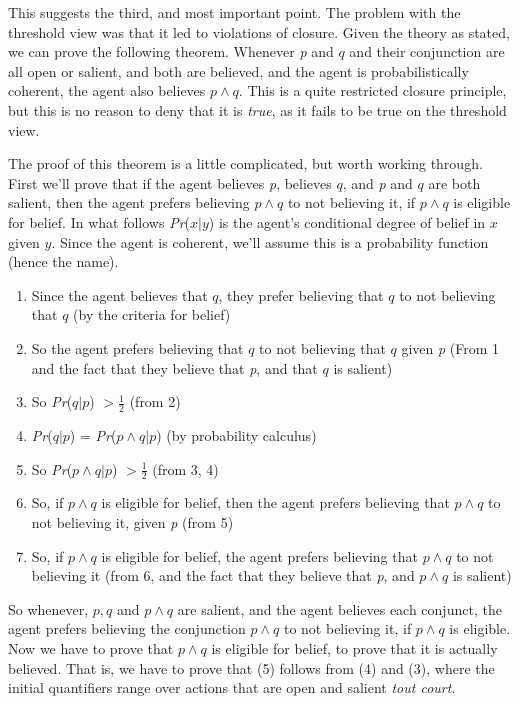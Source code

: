 \documentclass[
  11pt,
  letterpaper,
  DIV=11,
  numbers=noendperiod,
  oneside]{scrartcl}
\begin{document}
This suggests the third, and most important point. The problem with the
threshold view was that it led to violations of closure. Given the
theory as stated, we can prove the following theorem. Whenever \emph{p}
and \(q\) and their conjunction are all open or salient, and both are
believed, and the agent is probabilistically coherent, the agent also
believes \(p \wedge q\). This is a quite restricted closure principle,
but this is no reason to deny that it is \emph{true}, as it fails to be
true on the threshold view.

The proof of this theorem is a little complicated, but worth working
through. First we'll prove that if the agent believes \emph{p}, believes
\(q\), and \emph{p} and \(q\) are both salient, then the agent prefers
believing \(p \wedge q\) to not believing it, if \(p \wedge q\) is
eligible for belief. In what follows \emph{Pr}(\(x | y\)) is the agent's
conditional degree of belief in \(x\) given \(y\). Since the agent is
coherent, we'll assume this is a probability function (hence the name).

\begin{enumerate}
\def\labelenumi{\arabic{enumi}.}
\item
  Since the agent believes that \(q\), they prefer believing that \(q\)
  to not believing that \(q\) (by the criteria for belief)
\item
  So the agent prefers believing that \(q\) to not believing that \(q\)
  given \emph{p} (From 1 and the fact that they believe that \emph{p},
  and that \(q\) is salient)
\item
  So \emph{Pr}(\(q | p\)) \(> \frac{1}{2}\) (from 2)
\item
  \emph{Pr}(\(q | p\)) = \emph{Pr}(\(p \wedge q | p\)) (by probability
  calculus)
\item
  So \emph{Pr}(\(p \wedge q | p\)) \(> \frac{1}{2}\) (from 3, 4)
\item
  So, if \(p \wedge q\) is eligible for belief, then the agent prefers
  believing that \(p \wedge q\) to not believing it, given \emph{p}
  (from 5)
\item
  So, if \(p \wedge q\) is eligible for belief, the agent prefers
  believing that \(p \wedge q\) to not believing it (from 6, and the
  fact that they believe that \emph{p}, and \(p \wedge q\) is salient)
\end{enumerate}

So whenever, \(p, q\) and \(p \wedge q\) are salient, and the agent
believes each conjunct, the agent prefers believing the conjunction
\(p \wedge q\) to not believing it, if \(p \wedge q\) is eligible. Now
we have to prove that \(p \wedge q\) is eligible for belief, to prove
that it is actually believed. That is, we have to prove that (5) follows
from (4) and (3), where the initial quantifiers range over actions that
are open and salient \emph{tout court}.
\end{document}
